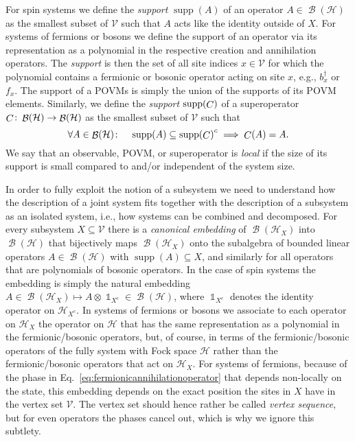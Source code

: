 \documentclass[a4paper,12pt,listof=totoc,index=totoc,bibliography=totoc,headsepline=false,headings=normal,BCOR16.153846mm,DIV12,headinclude,twoside,cleardoublepage=empty,numbers=noenddot,final]{scrreprt}
\theoremstyle{mystyle}
\numberwithin{equation}{section}
\numberwithin{figure}{section}
\numberwithin{lemma}{section}
\numberwithin{theorem}{section}
\numberwithin{corollary}{section}
\numberwithin{definition}{section}
\numberwithin{conjecture}{section}
\numberwithin{observation}{section}
\newcommand{\+}{\mkern2mu}
\newcommand{\texteqref}[1]{Eq.~\eqref{#1}}
\newcommand{\oftype}{\colon}
\newcommand{\itholds}{\colon\mathchoice{\quad}{}{}{}}
\newcommand{\Vset}{\mathcal{V}}
\newcommand{\ad}{^\dagger}
\newcommand{\compl}[1]{{{#1}^c}}
\DeclareMathOperator{\1}{\mathds{1}}
\DeclareMathOperator{\Bop}{\mathcal{B}}
\DeclareMathOperator{\Chann}{\mathnormal{C}}
\DeclareMathOperator{\supp}{supp}
\newcommand{\mc}[1]{\mathcal{#1}}
\newcommand{\mcH}{\mc{H}}
\begin{document}
For spin systems we define the \emph{support} $\supp(A)$ of an operator $A \in \Bop(\mcH)$ as the smallest subset of $\Vset$ such that $A$ acts like the identity outside of $X$.
For systems of fermions or bosons we define the support of an operator via its representation as a polynomial in the respective creation and annihilation operators.
The \emph{support} is then the set of all site indices $x\in\Vset$ for which the polynomial contains a fermionic or bosonic operator acting on site $x$, e.g., $b_x\ad$ or $f_x$.
The support of a POVMs is simply the union of the supports of its POVM elements.
Similarly, we define the \emph{support} $\supp(\Chann)$ of a superoperator $\Chann\oftype\Bop(\mcH)\to\Bop(\mcH)$ as the smallest subset of $\Vset$ such that
\begin{equation}
  \forall A \in \Bop(\mcH) \itholds \supp(A) \subseteq \compl{\supp(\Chann)} \implies \Chann(A) = A .
\end{equation}
We say that an observable, POVM, or superoperator is \emph{local} if the size of its support is small compared to and/or independent of the system size.

In order to fully exploit the notion of a subsystem we need to understand how the description of a joint system fits together with the description of a subsystem as an isolated system, i.e., how systems can be combined and decomposed.
For every subsystem $X \subseteq \Vset$ there is a \emph{canonical embedding} of $\Bop(\mcH_X)$ into $\Bop(\mcH)$ that bijectively maps $\Bop(\mcH_X)$ onto the subalgebra of bounded linear operators $A \in \Bop(\mcH)$ with $\supp(A) \subseteq X$, and similarly for all operators that are polynomials of bosonic operators.
In the case of spin systems the embedding is simply the natural embedding $A \in \Bop(\mcH_X) \mapsto A \otimes \1_{\compl X} \in \Bop(\mcH)$, where $\1_{\compl X}$ denotes the identity operator on $\mcH_{\compl X}$.
In systems of fermions or bosons we associate to each operator on $\mcH_X$ the operator on $\mcH$ that has the same representation as a polynomial in the fermionic/bosonic operators, but, of course, in terms of the fermionic/bosonic operators of the fully system with Fock space $\mcH$ rather than the fermionic/bosonic operators that act on $\mcH_X$.
For systems of fermions, because of the phase in \texteqref{eq:fermionicannihilationoperator} that depends non-locally on the state, this embedding depends on the exact position the sites in $X$ have in the vertex set $\Vset$.
The vertex set should hence rather be called \emph{vertex sequence}, but for even operators the phases cancel out, which is why we ignore this subtlety.
\end{document}
